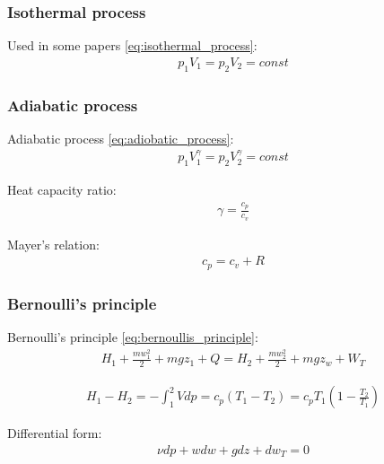 \documentclass[class=article, crop=false]{standalone}
\begin{document}
\subsubsection{Isothermal process}
Used in some papers \ref{eq:isothermal_process}:
\begin{align}
    p_1 V_1 = p_2 V_2 = const
    \label{eq:isothermal_process}
\end{align}
\subsubsection{Adiabatic process}

Adiabatic process \ref{eq:adiobatic_process}:
\begin{align}
     p_1V_1^{\gamma} =  p_2V_2^{\gamma} = const
    \label{eq:adiobatic_process}
\end{align}

Heat capacity ratio:
\begin{align}
    \gamma = \frac{c_p}{c_v}
\end{align}

Mayer's relation:
\begin{align}
    c_p = c_v + R
\end{align}

\subsubsection{Bernoulli's principle}
Bernoulli's principle \ref{eq:bernoullis_principle}:
\begin{align}
    H_1 + \frac{mw_1^2}{2} + mgz_1 + Q = H_2 + \frac{mw_2^2}{2} + mgz_w +
    W_T
    \label{eq:bernoullis_principle}
\end{align}

\begin{align}
    H_1- H_2 = -\int_1^2 V dp = c_p(T_1-T_2) = c_p T_1(1-\frac{T_2}{T_1})
    \label{eq:etalpi_sub}
\end{align}

Differential form:
\begin{align}
    \nu dp + w dw + g dz + dw_T = 0
\end{align}
\end{document}
